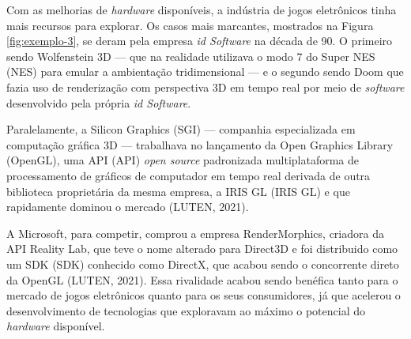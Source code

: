 Com as melhorias de \textit{hardware} disponíveis, a indústria de jogos eletrônicos tinha mais recursos para explorar. Os casos mais marcantes, mostrados na Figura \ref{fig:exemplo-3}, se deram pela empresa \textit{id Software} na década de 90. O primeiro sendo Wolfenstein 3D --- que na realidade utilizava o modo 7 do Super NES (\acrlong{NES}) para emular a ambientação tridimensional --- e o segundo sendo Doom que fazia uso de renderização com perspectiva 3D em tempo real por meio de \textit{software} desenvolvido pela própria \textit{id Software}.
	
    \begin{figure}[h]
		\centering
	\end{figure}
	\nocite{figura3}
	
Paralelamente, a Silicon Graphics (\acrshort{SGI}) --- companhia especializada em computação gráfica 3D --- trabalhava no lançamento da Open Graphics Library (\acrshort{OpenGL}), uma \acrlong{API} (API) \textit{open source} padronizada multiplataforma de processamento de gráficos de computador em tempo real derivada de outra biblioteca proprietária da mesma empresa, a IRIS GL (\acrlong{IRIS GL}) e que rapidamente dominou o mercado (LUTEN, 2021)\nocite{openGLBook}. 

A Microsoft, para competir, comprou a empresa RenderMorphics, criadora da \acrshort{API} Reality Lab, que teve o nome alterado para Direct3D e foi distribuido como um SDK (\acrlong{SDK}) conhecido como DirectX, que acabou sendo o concorrente direto da \acrshort{OpenGL} (LUTEN, 2021)\nocite{openGLBook}. Essa rivalidade acabou sendo benéfica tanto para o mercado de jogos eletrônicos quanto para os seus consumidores, já que acelerou o desenvolvimento de tecnologias que exploravam ao máximo o potencial do \textit{hardware} disponível.
	
